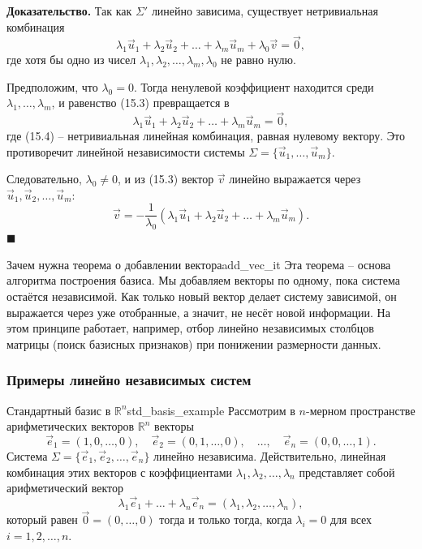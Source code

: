 \documentclass[12pt,a4paper]{article}
\newenvironment{myproof}{\noindent\textbf{Доказательство.}}{\hfill$\blacksquare$}
\begin{document}
\begin{myproof}
  Так как $\Sigma'$ линейно зависима, существует нетривиальная комбинация
  \begin{equation}
    \lambda_1 \vec{u}_1 + \lambda_2 \vec{u}_2 + \dots + \lambda_m
    \vec{u}_m + \lambda_0 \vec{v} = \vec{0},
    \tag{15.3}
  \end{equation}
  где хотя бы одно из чисел $\lambda_1, \lambda_2, \dots, \lambda_m,
  \lambda_0$ не равно нулю.

  Предположим, что $\lambda_0 = 0$. Тогда ненулевой коэффициент находится
  среди $\lambda_1, \dots, \lambda_m$, и равенство (15.3) превращается в
  \begin{equation}
    \lambda_1 \vec{u}_1 + \lambda_2 \vec{u}_2 + \dots + \lambda_m
    \vec{u}_m = \vec{0},
    \tag{15.4}
  \end{equation}
  где (15.4) -- нетривиальная линейная комбинация, равная нулевому
  вектору. Это противоречит линейной независимости системы $\Sigma =
  \{\vec{u}_1, \dots, \vec{u}_m\}$.

  Следовательно, $\lambda_0 \neq 0$, и из (15.3) вектор $\vec{v}$ линейно
  выражается через $\vec{u}_1, \vec{u}_2, \dots, \vec{u}_m$:
  \[
    \vec{v} = -\frac{1}{\lambda_0}\left(\lambda_1 \vec{u}_1 + \lambda_2
    \vec{u}_2 + \dots + \lambda_m \vec{u}_m\right).
  \]
\end{myproof}

\begin{remarkIT}{Зачем нужна теорема о добавлении вектора}{add_vec_it}
  Эта теорема -- основа алгоритма построения базиса. Мы добавляем векторы
  по одному, пока система остаётся независимой. Как только новый вектор
  делает систему зависимой, он выражается через уже отобранные, а значит,
  не несёт новой информации. На этом принципе работает, например, отбор
  линейно независимых столбцов матрицы (поиск базисных признаков) при
  понижении размерности данных.
\end{remarkIT}

\subsubsection*{Примеры линейно независимых систем}

\begin{definition}{Стандартный базис в $\mathbb{R}^n$}{std_basis_example}
  Рассмотрим в $n$-мерном пространстве арифметических векторов
  $\mathbb{R}^n$ векторы
  \[
    \vec{e}_1 = (1, 0, \dots, 0), \quad
    \vec{e}_2 = (0, 1, \dots, 0), \quad \dots, \quad
    \vec{e}_n = (0, 0, \dots, 1).
  \]
  Система $\Sigma = \{\vec{e}_1, \vec{e}_2, \dots, \vec{e}_n\}$ линейно
  независима. Действительно, линейная комбинация этих векторов с
  коэффициентами $\lambda_1, \lambda_2, \dots, \lambda_n$ представляет
  собой арифметический вектор
  \[
    \lambda_1 \vec{e}_1 + \dots + \lambda_n \vec{e}_n = (\lambda_1,
    \lambda_2, \dots, \lambda_n),
  \]
  который равен $\vec{0} = (0, \dots, 0)$ тогда и только тогда, когда
  $\lambda_i = 0$ для всех $i = 1, 2, \dots, n$.
\end{definition}
\end{document}
